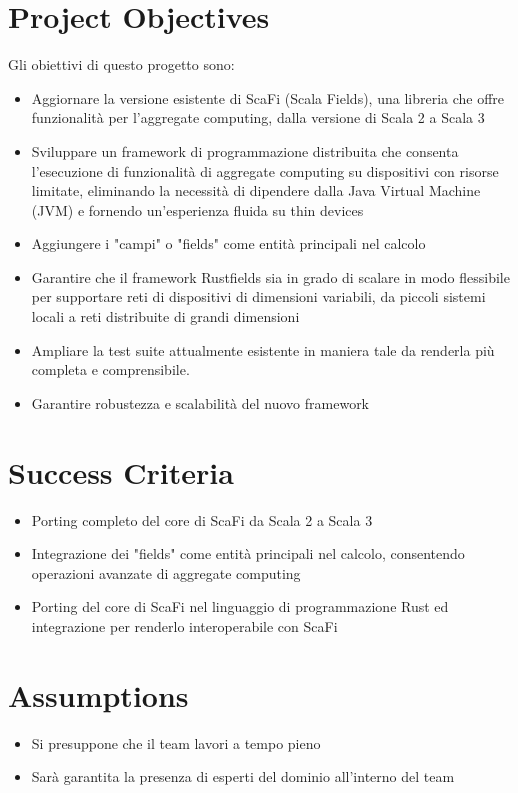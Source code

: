 \documentclass[12pt, a4paper]{article}
\begin{document}
\section*{Project Objectives}
Gli obiettivi di questo progetto sono:
\begin{itemize}
    \item Aggiornare la versione esistente di ScaFi (Scala Fields), una libreria che offre funzionalità
          per l'aggregate computing, dalla versione di Scala 2 a Scala 3
    \item Sviluppare un framework di programmazione distribuita che consenta l'esecuzione di funzionalità di aggregate computing su dispositivi
          con risorse limitate, eliminando la necessità di dipendere dalla Java Virtual Machine (JVM) e fornendo un'esperienza fluida su thin devices
    \item Aggiungere i "campi" o "fields" come entità principali nel calcolo
    \item Garantire che il framework Rustfields sia in grado di scalare in modo flessibile per supportare reti di dispositivi di dimensioni
          variabili, da piccoli sistemi locali a reti distribuite di grandi dimensioni
    \item Ampliare la test suite attualmente esistente in maniera tale da renderla più completa e comprensibile.
    \item Garantire robustezza e scalabilità del nuovo framework
\end{itemize}

\section*{Success Criteria}
\begin{itemize}
    \item Porting completo del core di ScaFi da Scala 2 a Scala 3
    \item Integrazione dei "fields" come entità principali nel calcolo, consentendo operazioni avanzate di aggregate computing
    \item Porting del core di ScaFi nel linguaggio di programmazione Rust ed integrazione per renderlo interoperabile con ScaFi
\end{itemize}

\section*{Assumptions}
\begin{itemize}
    \item Si presuppone che il team lavori a tempo pieno
    \item Sarà garantita la presenza di esperti del dominio all'interno del team
\end{itemize}
\end{document}
